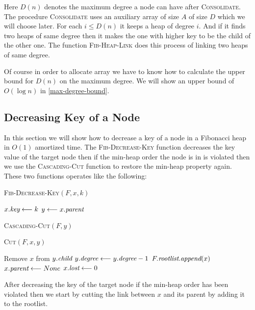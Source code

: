 Here $D(n)$ denotes the maximum degree a node can have after \textsc{Consolidate}. The procedure \textsc{Consolidate} uses an auxiliary array of size $A$ of size $D$ which we will choose later. For each $i\leq D(n)$ it keeps a heap of degree $i$. And if it finds two heaps of same degree then it makes the one with higher key to be the child of the other one. The function \textsc{Fib-Heap-Link} does this process of linking two heaps of same degree.\parinn

Of course in order to allocate array we have to know how to calculate the upper bound for $D(n)$ on the maximum degree. We will show an upper bound of $O(\log n)$ in \autoref{max-degree-bound}.


\subsection{Decreasing Key of a Node}
In this section we will show how to decrease a key of a node in a Fibonacci heap in $O(1)$ amortized time. The \textsc{Fib-Decrease-Key} function decreases the key value of the target node then if the min-heap order the node is in is violated then we use the \textsc{Cascading-Cut} function to restore the min-heap property again. These two functions operates like the following:
\begin{center}
	\begin{minipage}{0.45\textwidth}
		\begin{algorithm}[H]
			\caption{\textsc{Fib-Decrease-Key}$(F,x,k)$}
			\DontPrintSemicolon
			$x.\emph{key}\longleftarrow k$\;
			$y\longleftarrow x.\emph{parent}$\;
		\end{algorithm}
	\end{minipage}\hfill
	\begin{minipage}{0.45\textwidth}
		\begin{algorithm}[H]
			\caption{\textsc{Cascading-Cut}$(F,y)$}
			\DontPrintSemicolon
		\end{algorithm}
		\begin{algorithm}[H]
			\caption{\textsc{Cut}$(F,x,y)$}
			\DontPrintSemicolon
			Remove $x$ from $y.\emph{child}$\;
			$y.\emph{degree}\longleftarrow y.\emph{degree}-1$\;
			$F.\emph{rootlist}.\emph{append}(x)$\;
			$x.\emph{parent}\longleftarrow None$\;
			$x.\emph{lost}\longleftarrow 0$\;
		\end{algorithm}
	\end{minipage}
\end{center}
After decreasing the key of the target node if the min-heap order has been violated then we start by cutting the link between $x$ and its parent by adding it to the rootlist.
